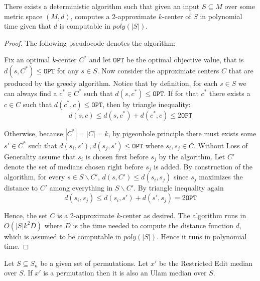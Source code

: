 \begin{theorem}
\label{KCenterApproximate}
    There exists a deterministic algorithm such that given an input $S \subseteq M$ over some metric space $(M, d)$, computes a 2-approximate $k$-center of $S$ in polynomial time given that $d$ is computable in $poly(|S|)$.
\end{theorem}

\begin{proof}
    The following pseudocode denotes the algorithm:

        

    Fix an optimal $k$-center $C^*$ and let $\texttt{OPT}$ be the optimal objective value, that is $d(s, C^*) \leq \texttt{OPT}$ for any $s \in S$. Now consider the approximate centers $C$ that are produced by the greedy algorithm. Notice that by definition, for each $s \in S$ we can always find a $c^* \in C^*$ such that $d(s, c^*) \leq \texttt{OPT}$. If for that $c^*$ there exists a $c \in C$ such that $d(c^*, c) \leq \texttt{OPT}$, then by triangle inequality:
    \[d(s, c) \leq d(s, c^*) + d(c^*, c) \leq 2 \texttt{OPT}\]

    Otherwise, because $|C^*| = |C| = k$, by pigeonhole principle there must exists some $s' \in C^*$ such that $d(s_i, s'), d(s_j, s') \leq \texttt{OPT}$ where $s_i, s_j \in C$. Without Loss of Generality assume that $s_i$ is chosen first before $s_j$ by the algorithm. Let $C'$ denote the set of medians chosen right before $s_j$ is added. By construction of the algorithm, for every $s \in S \backslash C'$, $d(s, C') \leq d(s_i, s_j)$ since $s_j$ maximizes the distance to $C'$ among everything in $S \backslash C'$. By triangle inequality again
    \[d(s_i, s_j) \leq d(s_i, s') + d(s', s_j) = 2 \texttt{OPT}\]

    Hence, the set $C$ is a 2-approximate $k$-center as desired. The algorithm runs in $O(|S| k^2 D)$ where $D$ is the time needed to compute the distance function $d$, which is assumed to be computable in $poly(|S|)$. Hence it runs in polynomial time.
\end{proof}

\begin{theorem}
\label{MedianRestrictedEdit}
    Let $S \subseteq S_n$ be a given set of permutations. Let $x'$ be the Restricted Edit median over $S$. If $x'$ is a permutation then it is also an Ulam median over $S$.
\end{theorem}


